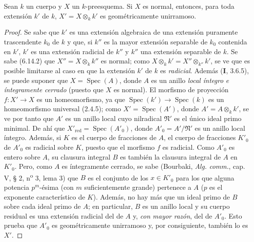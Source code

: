 \begin{proposition}[6.15.6]
\label{IV.2.s6.15.6-fr}
Sean $k$ un cuerpo y $X$ un $k$-preesquema. Si $X$ es normal,
entonces, para toda extensión $k'$ de $k$,
$X'=X\otimes_k k'$ es geométricamente unirramoso.
\end{proposition}

\begin{proof}
Se sabe que $k'$ es una extensión algebraica de una extensión
puramente trascendente $k_0$ de $k$ y que, si $k''$ es la mayor
extensión separable de $k_0$ contenida en $k'$, $k'$ es una
extensión radicial de $k''$ y $k''$ una extensión separable de
$k$. Se sabe (6.14.2) que $X''=X\otimes_k k''$ es normal; como
$X\otimes_k k'=X''\otimes_{k''}k'$, se ve que es posible limitarse al caso
en que la extensión $k'$ de $k$ es \emph{radicial}. Además (\textbf I, 3.6.5),
se puede suponer que $X=\operatorname{Spec}(A)$, donde $A$ es un
anillo \emph{local íntegro e íntegramente cerrado} (puesto que $X$
es normal). El morfismo de proyección $f:X'\to X$ es un
homeomorfismo, ya que
$\operatorname{Spec}(k')\to\operatorname{Spec}(k)$ es un
homeomorfismo universal (2.4.5); como
$X'=\operatorname{Spec}(A')$, donde $A'=A\otimes_k k'$, se ve
por tanto que $A'$ es un anillo local cuyo nilradical
$\mathfrak N'$ es el único ideal primo minimal. De ahí que
$X'_{\mathrm{red}}=\operatorname{Spec}(A'_0)$, donde
$A'_0=A'/\mathfrak N'$ es un anillo local íntegro. Además, si
$K$ es el cuerpo de fracciones de $A$, el cuerpo de fracciones
$K'_0$ de $A'_0$ es radicial sobre $K$, puesto que el morfismo
$f$ es radicial. Como $A'_0$ es entero sobre $A$, su clausura
integral $B$ es también la clausura integral de $A$ en $K'_0$.
Pero, como $A$ es íntegramente cerrado, se sabe (Bourbaki,
\emph{Alg. comm.}, cap. V, § 2, n\textsuperscript{o} 3, lema 3) que $B$ es el
conjunto de los $x\in K'_0$ para los que alguna potencia
$p^m$-ésima (con $m$ suficientemente grande) pertenece a $A$
($p$ es el exponente característico de $K$). Además, no hay
más que un ideal primo de $B$ sobre cada ideal primo de $A$; en
particular, $B$ es un anillo local y su cuerpo residual es una
extensión radicial del de $A$ y, \emph{con mayor razón}, del de
$A'_0$. Esto prueba que $A'_0$ es geométricamente unirramoso
y, por consiguiente, también lo es $X'$.
\end{proof}
